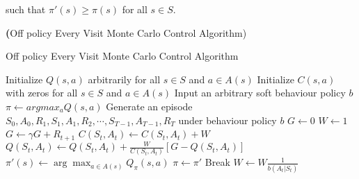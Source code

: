 \documentclass[../main.tex]{subfiles}
\begin{document}
such that $\pi'(s) \geq \pi(s)$ for all $s \in S$.

\textbf(Off policy Every Visit Monte Carlo Control Algorithm)

\begin{algorithm}[H]
\caption{Off policy Every Visit Monte Carlo Control Algorithm}
\label{alg:off-policy-every-visit-monte-carlo-control}
\begin{algorithmic}[1]

\State Initialize $Q(s,a)$ arbitrarily for all $s \in S$ and $a \in A(s)$
\State Initialize $C(s,a)$ with zeros for all $s \in S$ and $a \in A(s)$
\State Input an arbitrary soft behaviour  policy $b$ 
\State $\pi \gets argmax_a Q(s,a)$
\State Generate an episode $S_0, A_0, R_1, S_1, A_1, R_2, \cdots, S_{T-1}, A_{T-1}, R_{T}$ under behaviour policy $b$
\State $G \leftarrow 0$
\State $W \leftarrow 1$
\State $G \leftarrow \gamma G + R_{t+1}$
\State $C(S_t, A_t) \leftarrow C(S_t, A_t) + W$
\State $Q(S_t, A_t) \leftarrow Q(S_t, A_t) + \frac{W}{C(S_t, A_t)} \left[G - Q(S_t, A_t)\right]$
\State $\pi'(s) \leftarrow \arg\max_{a \in A(s)} Q_\pi(s,a)$
\State $\pi \leftarrow \pi'$
\State Break
\EndIf
\EndFor
\State $W \gets W \frac{1}{b(A_t|S_t)}$



\EndWhile
\end{algorithmic}
\end{algorithm}
\end{document}
